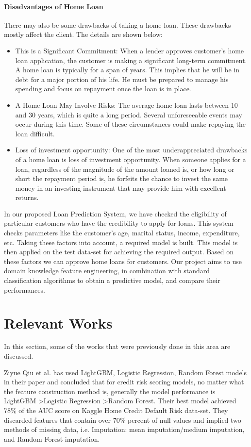 \documentclass[sigconf, nonacm]{acmart}
\begin{document}
\paragraph{Disadvantages of Home Loan}
There may also be some drawbacks of taking a home loan. These drawbacks mostly affect the client. The details are shown below:
\begin{itemize}
	\item This is a Significant Commitment:
	      When a lender approves customer's home loan application, the customer is making a significant long-term commitment. A home loan is typically for a span of years. This implies that he will be in debt for a major portion of his life. He must be prepared to manage his spending and focus on repayment once the loan is in place.
	\item A Home Loan May Involve Risks:
	      The average home loan lasts between 10 and 30 years, which is quite a long period. Several unforeseeable events may occur during this time. Some of these circumstances could make repaying the loan difficult.
	\item Loss of investment opportunity:
	      One of the most underappreciated drawbacks of a home loan is loss of investment opportunity. When someone applies for a loan, regardless of the magnitude of the amount loaned is, or how long or short the repayment period is, he forfeits the chance to invest the same money in an investing instrument that may provide him with excellent returns.
\end{itemize}

In our proposed Loan Prediction System, we have checked the eligibility of particular customers who have the credibility to apply for loans. This system checks parameters like the customer’s age, marital status, income, expenditure, etc. Taking these factors into account, a required model is built. This model is then applied on the test data-set for achieving the required output. Based on these factors we can approve home loans for customers. Our project aims to use domain knowledge feature engineering, in combination
with standard classification algorithms to obtain a predictive model, and compare their performances.

\section{Relevant Works}
In this section, some of the works that were previously done in this area are discussed.

Ziyue Qiu et al. \cite{9107890} has used LightGBM, Logistic Regression, Random Forest models in their paper and concluded that for credit risk scoring models, no matter what the feature construction method is, generally the model performance is LightGBM \textgreater  Logistic Regression \textgreater  Random Forest. Their best model achieved 78\% of the AUC score on Kaggle Home Credit Default Risk data-set. They discarded features that contain over 70\% percent of null values and implied two methods of missing data, i.e. Imputation: mean imputation/medium imputation, and Random Forest imputation. 
\end{document}
